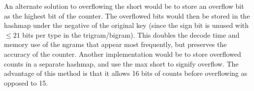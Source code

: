 \documentclass[11pt]{article}
\begin{document}
An alternate solution to overflowing the short would be to store an overflow bit as the highest bit of the counter. The overflowed bits would then be stored in the hashmap under the negative of the original key (since the sign bit is unused with $\le21$ bits per type in the trigram/bigram). This doubles the decode time and memory use of the ngrams that appear most frequently, but preserves the accuracy of the counter. Another implementation would be to store overflowed counts in a separate hashmap, and use the max short to signify overflow. The advantage of this method is that it allows 16 bits of counts before overflowing as opposed to 15.
\end{document}
